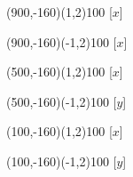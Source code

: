 \documentclass[12pt]{article}
\begin{document}
\begin{figure}[htb]
\begin{egame}
\renewcommand{\egarrowstyle}{}

\putbranch(900,-160)(1,2){100}
[$x$]

\renewcommand{\egarrowstyle}{}

\putbranch(900,-160)(-1,2){100}
[$x$]

\renewcommand{\egarrowstyle}{}

\putbranch(500,-160)(1,2){100}
[$x$]

\renewcommand{\egarrowstyle}{}

\putbranch(500,-160)(-1,2){100}
[$y$]

\renewcommand{\egarrowstyle}{}

\putbranch(100,-160)(1,2){100}
[$x$]

\renewcommand{\egarrowstyle}{}

\putbranch(100,-160)(-1,2){100}
[$y$]

\renewcommand{\egarrowstyle}{}


\end{egame}
\end{figure}
\end{document}
